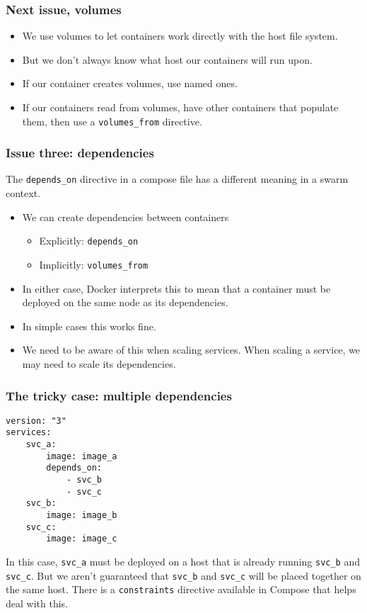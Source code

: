 \documentclass[10pt]{beamer}
\begin{document}
\begin{frame}
  \frametitle{Next issue, volumes}
   
   \begin{itemize}
     \item We use volumes to let containers work directly with the host file system.
     \item But we don't always know what host our containers will run upon.
     \item If our container creates volumes, use named ones.
     \item If our containers read from volumes, have other containers that populate them, then use a \texttt{volumes\_from} directive.
   \end{itemize}
\end{frame}

\begin{frame}
  \frametitle{Issue three: dependencies}
   
   The \texttt{depends\_on} directive in a compose file has a different meaning in a swarm context.
   \begin{itemize}
     \item We can create dependencies between containers
              \begin{itemize}
                \item Explicitly: \texttt{depends\_on}
                \item Implicitly: \texttt{volumes\_from}
              \end{itemize}
         
     \item In either case, Docker interprets this to mean that a container must be deployed on the same node as its dependencies.
     \item In simple cases this works fine.
     \item We need to be aware of this when scaling services. When scaling a service, we may need to scale its dependencies.
   \end{itemize}
\end{frame}


\begin{frame}[fragile]
    \frametitle{The tricky case: multiple dependencies}
    
    \begin{verbatim}
version: "3"
services:
    svc_a:  
        image: image_a
        depends_on:
            - svc_b
            - svc_c
    svc_b:  
        image: image_b
    svc_c:  
        image: image_c
    \end{verbatim}
    
    In this case, \texttt{svc\_a} must be deployed on a host that is already running \texttt{svc\_b} and \texttt{svc\_c}. But we aren't guaranteed that 
    \texttt{svc\_b} and \texttt{svc\_c} will be placed together on the same host. There is a \texttt{constraints} directive available in Compose that helps deal with this.
\end{frame}
\end{document}
